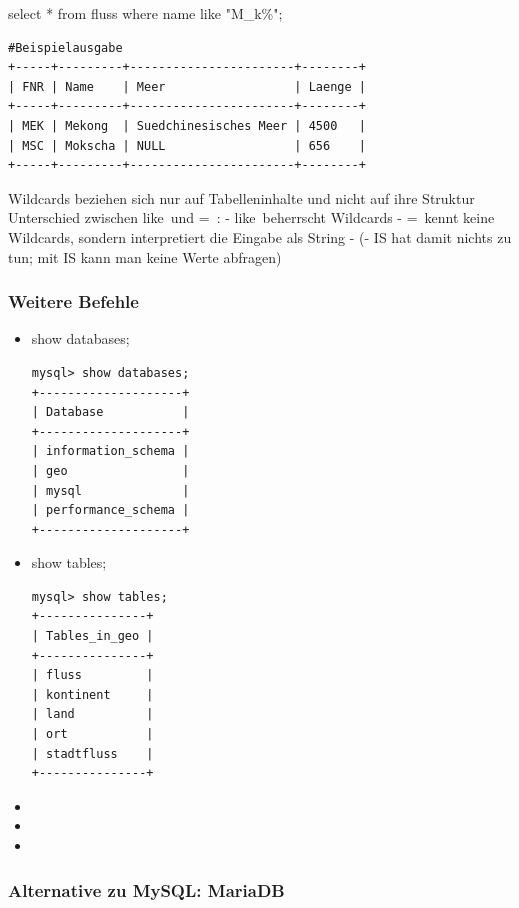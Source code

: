 select * from fluss where name like "M\_k\%";
\begin{lstlisting}
#Beispielausgabe
+-----+---------+-----------------------+--------+
| FNR | Name    | Meer                  | Laenge |
+-----+---------+-----------------------+--------+
| MEK | Mekong  | Suedchinesisches Meer | 4500   |
| MSC | Mokscha | NULL                  | 656    |
+-----+---------+-----------------------+--------+
\end{lstlisting}

Wildcards beziehen sich nur auf Tabelleninhalte und nicht auf ihre Struktur
Unterschied zwischen \ql like\qr\ und \ql =\qr\ :
- \ql like\qr\ beherrscht Wildcards
- \ql =\qr\ kennt keine Wildcards, sondern interpretiert die Eingabe als String
- (- IS hat damit nichts zu tun; mit IS kann man keine Werte abfragen)

\subsubsection{Weitere Befehle}
\begin{itemize}
	\item show databases;
	\begin{lstlisting}
mysql> show databases;
+--------------------+
| Database           |
+--------------------+
| information_schema |
| geo                |
| mysql              |
| performance_schema |
+--------------------+
	\end{lstlisting}
	\item show tables;
	\begin{lstlisting}
mysql> show tables;
+---------------+
| Tables_in_geo |
+---------------+
| fluss         |
| kontinent     |
| land          |
| ort           |
| stadtfluss    |
+---------------+
	\end{lstlisting}
	\item 
	\item 
	\item 
\end{itemize}

\subsubsection{Alternative zu MySQL: MariaDB}

